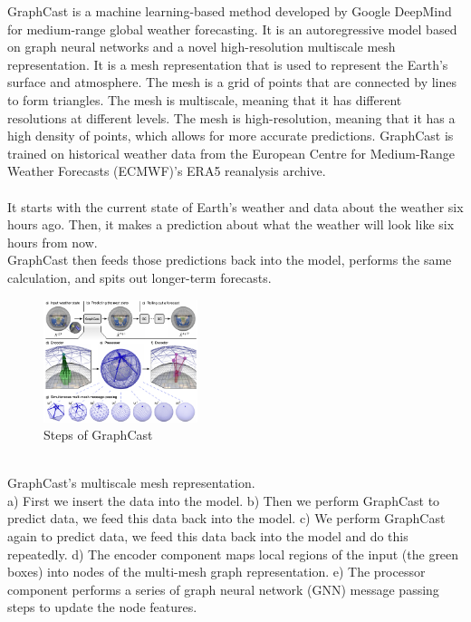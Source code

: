 \documentclass[../paper.tex]{subfiles}
\begin{document}
    GraphCast is a machine learning-based method developed by Google DeepMind for medium-range global weather forecasting.
    It is an autoregressive model based on graph neural networks and a novel high-resolution multiscale mesh representation.
    It is a mesh representation that is used to represent the Earth's surface and atmosphere.
    The mesh is a grid of points that are connected by lines to form triangles.
    The mesh is multiscale, meaning that it has different resolutions at different levels.
    The mesh is high-resolution, meaning that it has a high density of points, which allows for more accurate predictions.
    GraphCast is trained on historical weather data from the European Centre for Medium-Range Weather Forecasts (ECMWF)'s ERA5 reanalysis archive\cite{e1}.
    \\\\
    It starts with the current state of Earth's weather and data about the weather six hours ago.
    Then, it makes a prediction about what the weather will look like six hours from now.\\
    GraphCast then feeds those predictions back into the model, performs the same calculation, and spits out longer-term forecasts\cite{e1}.\\
    \begin{figure}[htbp]
        \centerline{\includegraphics[width=0.4\textwidth]{../photos/multimesh_graphcast}}
        \caption{Steps of GraphCast}
        \label{fig:multimesh-graphcast}
    \end{figure}\\
    GraphCast's multiscale mesh representation. \\
    a) First we insert the data into the model.
    b) Then we perform GraphCast to predict data, we feed this data back into the model.
    c) We perform GraphCast again to predict data, we feed this data back into the model and do this repeatedly.
    d) The encoder component maps local regions of the input (the green boxes) into nodes of the multi-mesh graph representation.
    e) The processor component performs a series of graph neural network (GNN) message passing steps to update the node features.
\end{document}
